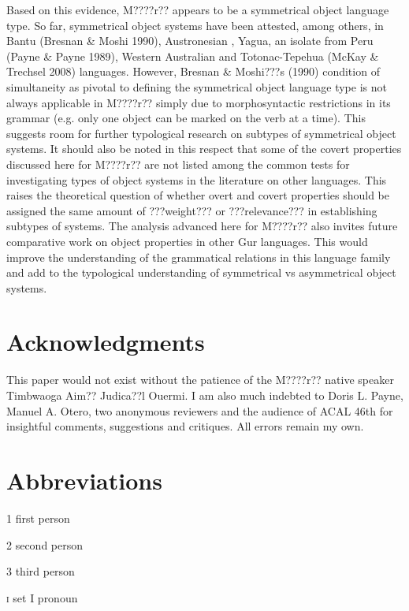 \documentclass[output=paper]{langsci/langscibook}
\begin{document}
Based on this evidence, M????r?? appears to be a symmetrical object language type. So far, symmetrical object systems have been attested, among others, in Bantu (Bresnan \& Moshi 1990), Austronesian \citep{Donohue1996}, Yagua, an isolate from Peru (Payne \& Payne 1989), Western Australian \citep{Dench1995} and Totonac-Tepehua (McKay \& Trechsel 2008) languages. However, Bresnan \& Moshi???s (1990)  condition of simultaneity as pivotal to defining the symmetrical object language type is not always applicable in M????r?? simply due to morphosyntactic restrictions in its grammar (e.g. only one object can be marked on the verb at a time). This suggests room for further typological research on subtypes of symmetrical object systems. It should also be noted in this respect that some of the covert properties discussed here for M????r?? are not listed among the common tests for investigating types of object systems in the literature on other languages. This raises the theoretical question of whether overt and covert properties should be assigned the same amount of ???weight??? or ???relevance??? in establishing subtypes of systems. The analysis advanced here for M????r?? also invites future comparative work on object properties in other Gur languages. This would improve the understanding of the grammatical relations in this language family and add to the typological understanding of symmetrical vs asymmetrical object systems.

\section*{Acknowledgments}

This paper would not exist without the patience of the M????r?? native speaker Timbwaoga Aim?? Judica??l Ouermi. I am also much indebted to Doris L. Payne, Manuel A. Otero, two anonymous reviewers and the audience of ACAL 46th for insightful comments, suggestions and critiques. All errors remain my own. 

\section{Abbreviations}

1  first person



2  second person



3  third person



\textsc{i  }set I pronoun
\end{document}
